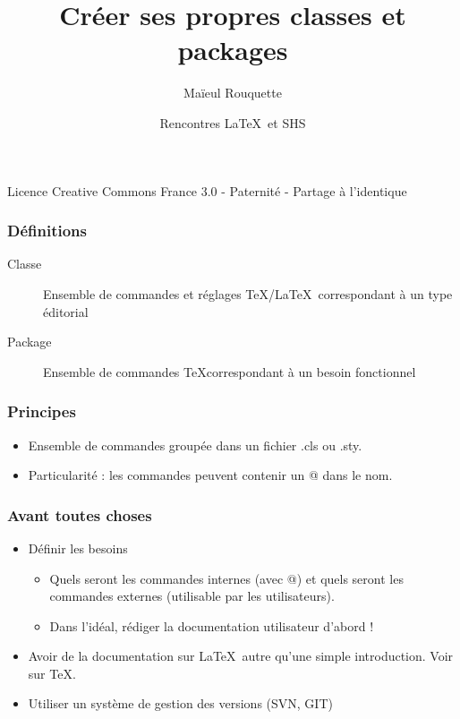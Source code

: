 \documentclass{beamer}
\author{Maïeul Rouquette}
\date{Rencontres \LaTeX\ et SHS}
\title{Créer ses propres classes et packages}
\institute{Université de Lausanne --- IRSB}
\begin{document}
\begin{frame}
	\titlepage
	\vfill
	{\tiny Licence Creative Commons France 3.0 - Paternité - Partage à l'identique}
\end{frame}


\begin{frame}
	\frametitle{Définitions}
	\begin{description}
		\item[Classe]Ensemble de commandes et réglages \TeX/\LaTeX\ correspondant à un type éditorial
		\item[Package]Ensemble de commandes \TeX correspondant à un besoin fonctionnel
	\end{description}
\end{frame}

\begin{frame}
	\frametitle{Principes}
	\begin{itemize}
		\item<1->Ensemble de commandes groupée dans un fichier .cls ou .sty.
		\item<2->Particularité : les commandes peuvent contenir un @ dans le nom.
	\end{itemize}
\end{frame}

\begin{frame}
	\frametitle{Avant toutes choses}
	\begin{itemize}
		\item<1->Définir les besoins
			\begin{itemize}
				\item<2->Quels seront les commandes internes (avec @) et quels seront les commandes externes (utilisable par les utilisateurs).
				\item<3->Dans l'idéal, rédiger la documentation utilisateur d'abord !
			\end{itemize}
		\item<4->Avoir de la documentation sur \LaTeX\ autre qu'une simple introduction. Voir sur \TeX.
		\item<5->Utiliser un système de gestion des versions (SVN, GIT)
	\end{itemize}
\end{frame}
\end{document}
